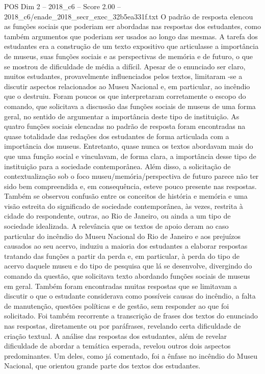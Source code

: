 \begin{textsample}{POS Dim 2 – 2018\_c6 – Score 2.00 – 2018\_c6/enade\_2018\_secr\_exec\_32b5ea331f.txt}
O padrão de resposta elencou as funções sociais que poderiam ser abordadas nas respostas dos estudantes, como também argumentos que poderiam ser usados ao longo das mesmas.
A tarefa dos estudantes era a construção de um texto expositivo que articulasse a importância de museus, suas funções sociais e as perspectivas de memória e de futuro, o que se mostrou de dificuldade de média a difícil.
Apesar de o enunciado ser claro, muitos estudantes, provavelmente influenciados pelos textos, limitaram -se a discutir aspectos relacionados ao Museu Nacional e, em particular, ao incêndio que o destruiu.
Foram poucos os que interpretaram corretamente o escopo do comando, que solicitava a discussão das funções sociais de museus de uma forma geral, no sentido de argumentar a importância deste tipo de instituição.
As quatro funções sociais elencadas no padrão de resposta foram encontradas na quase totalidade das redações dos estudantes de forma articulada com a importância dos museus.
Entretanto, quase nunca os textos abordavam mais do que uma função social e vinculavam, de forma clara, a importância desse tipo de instituição para a sociedade contemporânea.
Além disso, a solicitação de contextualização sob o foco museu/memória/perspectiva de futuro parece não ter sido bem compreendida e, em consequência, esteve pouco presente nas respostas.
Também se observou confusão entre os conceitos de história e memória e uma visão estreita do significado de sociedade contemporânea, às vezes, restrita à cidade do respondente, outras, ao Rio de Janeiro, ou ainda a um tipo de sociedade idealizada.
A relevância que os textos de apoio deram ao caso particular do incêndio do Museu Nacional do Rio de Janeiro e aos prejuízos causados ao seu acervo, induziu a maioria dos estudantes a elaborar respostas tratando das funções a partir da perda e, em particular, à perda do tipo de acervo daquele museu e do tipo de pesquisa que lá se desenvolve, divergindo do comando da questão, que solicitava texto abordando funções sociais de museus em geral.
Também foram encontradas muitas respostas que se limitavam a discutir o que o estudante considerava como possíveis causas do incêndio, a falta de manutenção, questões políticas e de gestão, sem responder ao que foi solicitado.
Foi também recorrente a transcrição de frases dos textos do enunciado nas respostas, diretamente ou por paráfrases, revelando certa dificuldade de criação textual.
A análise das respostas dos estudantes, além de revelar dificuldade de abordar a temática esperada, revelou outros dois aspectos predominantes.
Um deles, como já comentado, foi a ênfase no incêndio do Museu Nacional, que orientou grande parte dos textos dos estudantes.

\end{textsample}
